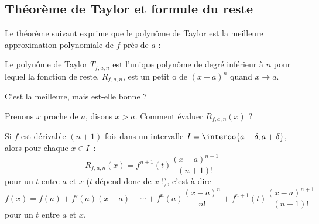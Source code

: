 \subsection*{Théorème de Taylor et formule du reste}
\begin{frame}%
  Le théorème suivant exprime que le polynôme de Taylor est la meilleure approximation polynomiale de \(f\) près de \(a\) :
  \begin{theorem}\label{thmtaylor}\pause{}
    Le polynôme de Taylor \(T_{f,a,n}\) est l'unique polynôme de degré inférieur à \(n\) pour lequel la fonction de reste, \(R_{f,a,n}\), est un \og petit o\fg{} de \((x-a)^{n}\) quand \(x \to a\).
  \end{theorem}\pause{}
  C'est la meilleure, mais est-elle bonne ?
\end{frame}
  

\begin{frame}
  Prenons \(x\) proche de \(a\), disons \(x > a\). Comment évaluer \(R_{f,a,n}(x)\) ?\pause{}
  
\begin{theorem}
  Si $f$ est dérivable $(n+1)$-fois dans un intervalle $I=\interoo{a-\delta,a+ \delta}$\pause{}, alors pour chaque $x \in I$~:\pause{}
\begin{equation*}
    R_{f,a,n}(x) = f^{\underline{n+1}}(t) \frac{(x-a)^{n+1}}{(n+1)!}
  \end{equation*}
    pour un $t$ entre $a$ et $x$ (\(t\) dépend donc de \(x\) !)\pause{}, c'est-à-dire\pause{}
\begin{equation*}
    f(x) =
    f(a)+f'(a)(x-a)+\cdots+f^{\underline{n}}(a) \frac{(x-a)^n}{n!}+ f^{\underline{n+1}}(t) \frac{(x-a)^{n+1}}{(n+1)!}
  \end{equation*}
    pour un $t$ entre $a$ et $x$.
\end{theorem}
\end{frame}


